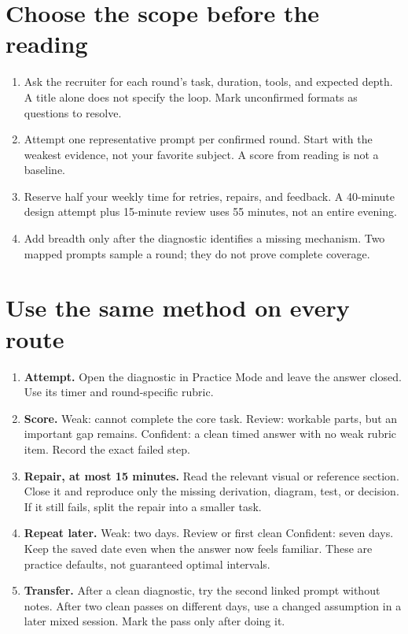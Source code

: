 \documentclass[10pt,letterpaper]{article}
\begin{document}
\section*{Choose the scope before the reading}
\begin{enumerate}
  \item Ask the recruiter for each round's task, duration, tools, and expected depth. A title alone does not specify the loop. Mark unconfirmed formats as questions to resolve.
  \item Attempt one representative prompt per confirmed round. Start with the weakest evidence, not your favorite subject. A score from reading is not a baseline.
  \item Reserve half your weekly time for retries, repairs, and feedback. A 40-minute design attempt plus 15-minute review uses 55 minutes, not an entire evening.
  \item Add breadth only after the diagnostic identifies a missing mechanism. Two mapped prompts sample a round; they do not prove complete coverage.
\end{enumerate}

\section*{Use the same method on every route}
\begin{enumerate}
  \item \textbf{Attempt.} Open the diagnostic in Practice Mode and leave the answer closed. Use its timer and round-specific rubric.
  \item \textbf{Score.} Weak: cannot complete the core task. Review: workable parts, but an important gap remains. Confident: a clean timed answer with no weak rubric item. Record the exact failed step.
  \item \textbf{Repair, at most 15 minutes.} Read the relevant visual or reference section. Close it and reproduce only the missing derivation, diagram, test, or decision. If it still fails, split the repair into a smaller task.
  \item \textbf{Repeat later.} Weak: two days. Review or first clean Confident: seven days. Keep the saved date even when the answer now feels familiar. These are practice defaults, not guaranteed optimal intervals.
  \item \textbf{Transfer.} After a clean diagnostic, try the second linked prompt without notes. After two clean passes on different days, use a changed assumption in a later mixed session. Mark the pass only after doing it.
\end{enumerate}
\end{document}
